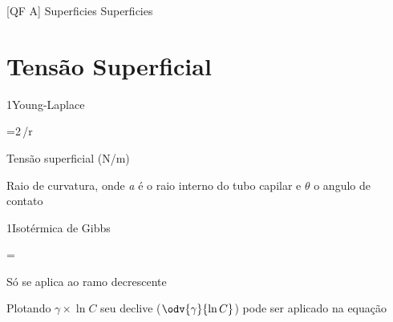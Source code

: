\documentclass[\mainfilename]{subfiles}
\begin{document}

[QF A]
{Superficies} %
{Superficies} %

\part*{Tensão Superficial}

\begin{sectionBox}1{Young-Laplace} %
    
    \begin{BM}
        =2\,\gamma/r
    \end{BM}
    \begin{description}[
        leftmargin=!,
        labelwidth=\widthof{\(r=a/\cos\theta\)} %
    ]
       \item[\(\gamma\)] Tensão superficial (\unit{\newton/\metre})
       \item[\(r=a/\cos\theta\)] Raio de curvatura, onde \textit{a} é o raio interno do tubo capilar e \(\theta\) o angulo de contato
    \end{description}
    
\end{sectionBox}

\begin{sectionBox}1{Isotérmica de Gibbs} %
    
    \begin{BM}
        \Gamma
        =
        \,
    \end{BM}
    \begin{description}[
        leftmargin=!,
        labelwidth=\widthof{} %
    ]
       \item[Dominio] Só se aplica ao ramo decrescente
    \end{description}

    Plotando \(\gamma\times\ln{C}\) seu declive (\(\odv{\gamma}{\ln{C}}\)) pode ser aplicado na equação
    
\end{sectionBox}
\end{document}
